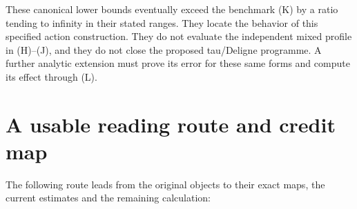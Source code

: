 These canonical lower bounds eventually exceed the benchmark (K) by a ratio tending to infinity in their stated ranges. They locate the behavior of this specified action construction. They do not evaluate the independent mixed profile in (H)--(J), and they do not close the proposed tau/Deligne programme. A further analytic extension must prove its error for these same forms and compute its effect through (L).



\section{A usable reading route and credit map}\label{a-usable-reading-route-and-credit-map}

The following route leads from the original objects to their exact maps, the current estimates and the remaining calculation:

